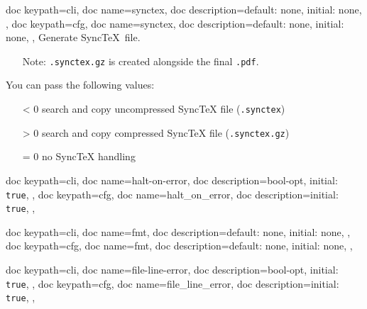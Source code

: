 \documentclass[a4paper, 11pt]{scrartcl}
\let\TeXold\TeX
\renewcommand\TeX{\TeXold\xspace}
\begin{document}
\begin{docKeys}[
		doc parameter={=\meta{synctex}},
	]{
		{
			doc keypath=cli,
			doc name=synctex,
			doc description={default: none, initial: none},
		},
		{
			doc keypath=cfg,
			doc name=synctex,
			doc description={default: none, initial: none},
		},
	}
	Generate Sync\TeX\ file.
	\begin{itemize}
		\item[Note:] \texttt{.synctex.gz} is created alongside the final \texttt{.pdf}.
	\end{itemize}

	You can pass the following values:
	\begin{itemize}
		\item[< 0] search and copy uncompressed Sync\TeX file (\texttt{.synctex})
		\item[> 0] search and copy   compressed Sync\TeX file (\texttt{.synctex.gz})
		\item[= 0] no Sync\TeX handling
	\end{itemize}
\end{docKeys}
\begin{docKeys}[
	]{
		{
			doc keypath=cli,
			doc name=halt-on-error,
			doc description={bool-opt, initial: \texttt{true}},
		},
		{
			doc keypath=cfg,
			doc name=halt_on_error,
			doc description={initial: \texttt{true}},
		},
	}
\end{docKeys}
\begin{docKeys}[
		doc parameter={=\meta{fmt}},
	]{
		{
			doc keypath=cli,
			doc name=fmt,
			doc description={default: none, initial: none},
		},
		{
			doc keypath=cfg,
			doc name=fmt,
			doc description={default: none, initial: none},
		},
	}
\end{docKeys}
\begin{docKeys}[
	]{
		{
			doc keypath=cli,
			doc name=file-line-error,
			doc description={bool-opt, initial: \texttt{true}},
		},
		{
			doc keypath=cfg,
			doc name=file_line_error,
			doc description={initial: \texttt{true}},
		},
	}
\end{docKeys}
\end{document}
